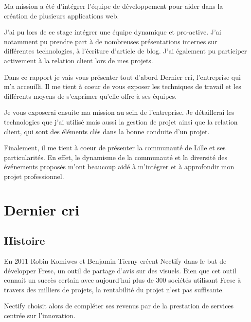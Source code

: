 \bigskip

Ma mission a été d'intégrer l'équipe de développement pour aider dans la
création de plusieurs applications web.

\bigskip

J'ai pu lors de ce stage intégrer une équipe dynamique et pro-active.
J'ai notamment pu prendre part à de nombreuses présentations internes
sur différentes technologies, à l'écriture d'article de blog. J'ai
également pu participer activement à la relation client lors de mes
projets.

\bigskip

Dans ce rapport je vais vous présenter tout d'abord Dernier cri,
l'entreprise qui m'a acceuilli. Il me tient à coeur de vous exposer les
techniques de travail et les différents moyens de s'exprimer qu'elle
offre à ses équipes.

\bigskip

Je vous exposerai ensuite ma mission au sein de l'entreprise. Je
détaillerai les technologies que j'ai utilisé mais aussi la gestion de
projet ainsi que la relation client, qui sont des éléments clés dans la
bonne conduite d'un projet.

\bigskip

Finalement, il me tient à coeur de présenter la communauté de Lille et
ses particularités. En effet, le dynamisme de la communauté et la
diversité des événements proposés m'ont beaucoup aidé à m'intégrer et à
approfondir mon projet professionnel.

\newpage

\section{Dernier cri}\label{dernier-cri}

\bigskip

\subsection{Histoire}\label{histoire}

\bigskip

En 2011 Robin Komiwes et Benjamin Tierny créent Nectify dans le but de
développer Fresc, un outil de partage d'avis sur des visuels. Bien que
cet outil connait un succès certain avec aujourd'hui plus de 300
sociétés utilisant Fresc à travers des milliers de projets, la
rentabilité du projet n'est pas suffisante.

\bigskip

Nectify choisit alors de compléter ses revenus par de la prestation de
services centrée sur l'innovation.

